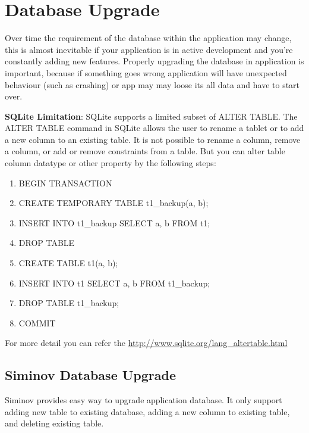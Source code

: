 \newpage
\chapter {\Large{Database Upgrade}}
Over time the requirement of the database within the application may change, this is almost inevitable if your application is in active development and you're constantly adding new features. Properly upgrading the database in application is important, because if something goes wrong application will have unexpected behaviour (such as crashing) or app may may loose its all data and have to start over.

\textbf{SQLite Limitation}: SQLite supports a limited subset of ALTER TABLE. The ALTER TABLE command in SQLite allows the user to rename a tablet or to add a new column to an existing table. It is not possible to rename a column, remove a column, or add or remove constraints from a table. But you can alter table column datatype or other property by the following steps:

\begin{enumerate}

	\item \small BEGIN TRANSACTION
	\item \small CREATE TEMPORARY TABLE t1\_backup(a, b);
	\item \small INSERT INTO t1\_backup SELECT a, b FROM t1;
	\item \small DROP TABLE
	\item \small CREATE TABLE t1(a, b);
	\item \small INSERT INTO t1 SELECT a, b FROM t1\_backup;
	\item \small DROP TABLE t1\_backup;
	\item \small COMMIT

\end{enumerate}

For more detail you can refer the \url{http://www.sqlite.org/lang_altertable.html}

\section{Siminov Database Upgrade}Siminov provides easy way to upgrade application database. It only support adding new table to existing database, adding a new column to existing table, and deleting existing table.

